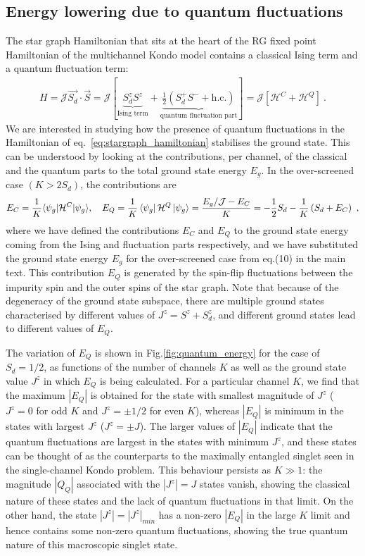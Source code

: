 \documentclass[10pt]{iopart}
\begin{document}
\subsection{Energy lowering due to quantum fluctuations}
The star graph Hamiltonian that sits at the heart of the RG fixed point Hamiltonian of the multichannel Kondo model contains a classical Ising term and a quantum fluctuation term:
\begin{eqnarray}
	H = {\mathcal{J}}\vec{S_d}\cdot\vec S = \mathcal{J}\left[\underbrace{S_d^z S^z}_\text{Ising term} + \underbrace{\frac{1}{2}\left(S_d^+ S^- + \text{h.c.}\right)}_\text{quantum fluctuation part} \right] = \mathcal{J}\left[\mathcal{H}^C + \mathcal{H}^Q\right] ~.
	\label{eq:stargraph_hamiltonian}
\end{eqnarray}
We are interested in studying how the presence of quantum fluctuations in the Hamiltonian of eq.~\ref{eq:stargraph_hamiltonian} stabilises the ground state. This can be understood by looking at the contributions, per channel, of the classical and the quantum parts to the total ground state energy \(E_g\). In the over-screened case \(\left( K > 2S_d \right) \), the contributions are
\begin{eqnarray}
	E_{C} = \frac{1}{K}\langle \psi_g | \mathcal{H}^C | \psi_g \rangle, \quad E_{Q} = \frac{1}{K}\bra{\psi_g}\mathcal{H}^Q \ket{\psi_g} =\frac{E_g/\mathcal{J} - E_{C}}{K} =  -\frac{1}{2}S_d - \frac{1}{K}\left(S_d + E_{C}\right)~,
\end{eqnarray}  
where we have defined the contributions \(E_C\) and \(E_Q\) to the ground state energy coming from the Ising and fluctuation parts respectively, and we have substituted the ground state energy \(E_g\) for the over-screened case from eq.(10) in the main text. This contribution $E_Q$ is generated by the spin-flip fluctuations between the impurity spin and the outer spins of the star graph. Note that because of the degeneracy of the ground state subspace, there are multiple ground states characterised by different values of \(J^z = S^z + S_d^z\), and different ground states lead to different values of \(E_Q\).

The variation of \(E_Q\) is shown in Fig.\ref{fig:quantum_energy} for the case of $S_d=1/2$, as functions of the number of channels \(K\) as well as the ground state value \(J^z\) in which \(E_Q\) is being calculated. For a particular channel $K$, we find that the maximum \(|E_Q|\) is obtained for the state with smallest magnitude of $J^z$ (\(J^z = 0 \) for odd \(K\) and \(J^z = \pm 1/2\) for even \(K\)), whereas \(|E_Q|\) is minimum in the states with largest \(J^z\) ($J^z=\pm J$). The larger values of \(|E_Q|\) indicate that the quantum fluctuations are largest in the states with minimum \(J^z\), and these states can be thought of as the counterparts to the maximally entangled singlet seen in the single-channel Kondo problem. This behaviour persists as \(K \gg 1\): the magnitude \(|Q_Q|\) associated with the $|J^z|= J$ states vanish, showing the classical nature of these states and the lack of quantum fluctuations in that limit. On the other hand, the state $|J^z| = |J^z|_{min}$ has a non-zero \(|E_Q|\) in the large \(K\) limit and hence contains some non-zero quantum fluctuations, showing the true quantum nature of this macroscopic singlet state.
\end{document}

